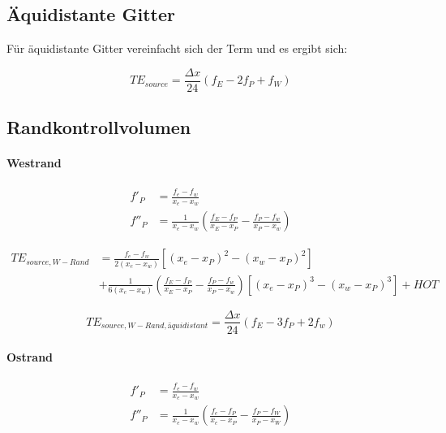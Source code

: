 \documentclass[10pt, ngerman,colorback,accentcolor=tud2d]{tudreport}
\begin{document}
\subsection{Äquidistante Gitter}

Für äquidistante Gitter vereinfacht sich der Term und es ergibt sich:

\begin{equation*}
  TE_{source} = \frac{\Delta x}{24} \left({f_E-2f_P+f_W}\right)
\end{equation*}

\subsection{Randkontrollvolumen}

\paragraph{Westrand}



\begin{align*}
  f'_P &=\frac{f_e-f_w}{x_e-x_w}\\
  f''_P &= \frac{1}{x_e-x_w}\left(\frac{f_E-f_P}{x_E-x_P}-\frac{f_P-f_w}{x_P-x_w}\right)
\end{align*}

\begin{align}
  TE_{source, W-Rand} &=
 \frac{f_e-f_w}{2(x_e-x_w)}  \left[{(x_e-x_P)^2-(x_w-x_P)^2}\right]\nonumber\\
&+\frac{1}{6(x_e-x_w)}\left(\frac{f_E-f_P}{x_E-x_P}-\frac{f_P-f_w}{x_P-x_w}\right)
  \left[{{(x_e-x_P)}^3-{(x_w-x_P)}^3}\right] + HOT
\end{align}

\begin{equation*}
  TE_{source, W-Rand, äquidistant} = \frac{\Delta x}{24} \left({f_E-3f_P+2f_w}\right)
\end{equation*}


\paragraph{Ostrand}

\begin{align*}
  f'_P &=\frac{f_e-f_w}{x_e-x_w}\\
  f''_P &= \frac{1}{x_e-x_w}\left(\frac{f_e-f_P}{x_e-x_P}-\frac{f_P-f_W}{x_P-x_W}\right)
\end{align*}
\end{document}
